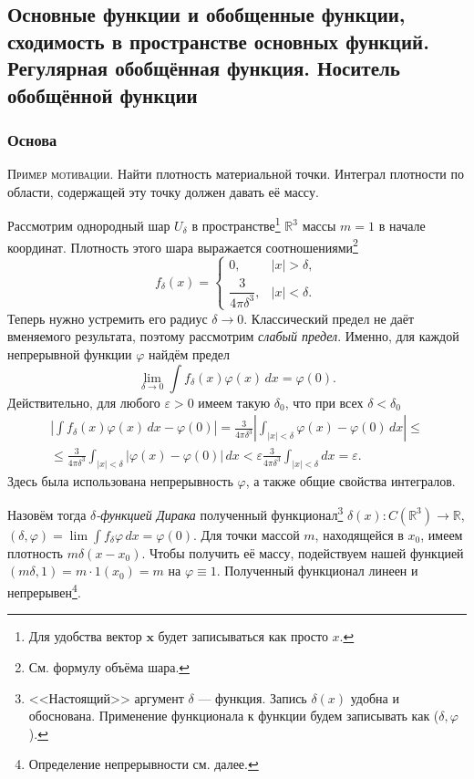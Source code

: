 \subsection{Основные функции и обобщенные функции, сходимость в пространстве основных функций. Регулярная обобщённая функция. Носитель обобщённой функции}
\subsubsection{Основа}
\textsc{Пример мотивации.} Найти плотность материальной точки. Интеграл
плотности по
области, содержащей эту точку должен давать её массу.

Рассмотрим однородный шар $ U_\delta $ в пространстве\footnote{Для удобства
	вектор $ \mathbf x $ будет записываться как просто $ x $.} $ \mathbb R^3 $ массы $ m = 1 $ в начале координат. Плотность этого шара выражается
соотношениями\footnote{См. формулу объёма шара.}  
\[
f_\delta(x) = \begin{cases}
	0, & |x| > \delta,\\
	\dfrac{3}{4\pi \delta^3}, & |x| < \delta.
\end{cases}
\]
Теперь нужно устремить его радиус $ \delta \to 0 $. Классический предел не
даёт вменяемого результата, поэтому рассмотрим \emph{слабый предел}. Именно, для
каждой непрерывной функции $ \varphi $ найдём предел 
\[
\lim_{\delta \to 0} \int f_\delta(x)\varphi(x) \, dx = \varphi(0).
\]
Действительно, для любого $ \varepsilon > 0 $ имеем такую $ \delta_0 $, что при
всех $ \delta < \delta_0 $ 
\begin{multline*}
	\left| \int f_\delta(x)\varphi(x)\, dx - \varphi(0) \right| =
	\frac{3}{4\pi\delta^3} \left| \int_{|x| < \delta} \varphi(x) - \varphi(0)\,dx
	\right| \leqslant\\\leqslant
	\frac{3}{4\pi\delta^3} \int_{|x|<\delta}|\varphi(x)-\varphi(0)|\, dx <
	\varepsilon \frac{3}{4\pi\delta^3} \int_{|x| <\delta} dx = \varepsilon.
\end{multline*}
Здесь была использована непрерывность $ \varphi $, а также общие свойства
интегралов.

\sloppy
Назовём тогда \emph{$ \delta $-функцией Дирака} полученный
функционал\footnote{<<Настоящий>> аргумент $ \delta $ --- функция. Запись $
	\delta(x) $ удобна и обоснована. Применение функционала к функции будем записывать как ($\delta,
	\varphi  $).} $ \delta(x)\colon C(\mathbb R^3) \to \mathbb R $, $(\delta, \varphi) = \lim\int
f_\delta\varphi\,dx = \varphi(0)$. Для точки массой $ m $, находящейся в
$ x_0  $, имеем плотность $
m\delta(x - x_0) $. Чтобы получить её массу, подействуем нашей функцией $ (m\delta, 1)
= m\cdot1(x_0) = m$ на $ \varphi\equiv 1 $. Полученный функционал линеен и
непрерывен\footnote{Определение непрерывности см. далее.}. 


